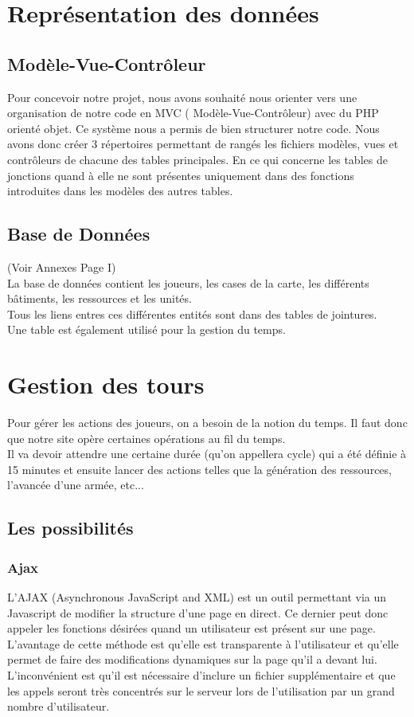 \documentclass[11pt,a4paper]{article}
\begin{document}
\newpage\section{Représentation des données}
\subsection{Modèle-Vue-Contrôleur}
Pour concevoir notre projet, nous avons souhaité nous orienter vers une organisation de notre code en MVC ( Modèle-Vue-Contrôleur) avec du PHP orienté objet. Ce système nous a permis de bien structurer notre code. Nous avons donc créer 3 répertoires permettant de rangés les fichiers modèles, vues et contrôleurs de chacune des tables principales. En ce qui concerne les tables de jonctions quand à elle ne sont présentes uniquement dans des fonctions introduites dans les modèles des autres tables.
\subsection{Base de Données}
(Voir Annexes Page I) \\
La base de données contient les joueurs, les cases de la carte, les différents bâtiments, les ressources et les unités.  \\
Tous les liens entres ces différentes entités sont dans des tables de jointures.\\
Une table est également utilisé pour la gestion du temps.

\newpage\section{Gestion des tours}
Pour gérer les actions des joueurs, on a besoin de la notion du temps. Il faut donc que notre site opère certaines opérations au fil du temps. \\
Il va devoir attendre une certaine durée (qu'on appellera cycle) qui a été définie à 15 minutes et ensuite lancer des actions telles que la génération des ressources, l'avancée d'une armée, etc...\\
\subsection{Les possibilités}
\subsubsection{Ajax}
L'AJAX (Asynchronous JavaScript and XML) est un outil permettant via un Javascript de modifier la structure d'une page en direct. 
Ce dernier peut donc appeler les fonctions désirées quand un utilisateur est présent sur une page.\\
L'avantage de cette méthode est qu'elle est transparente à l'utilisateur et qu'elle permet de faire des modifications dynamiques sur la page qu'il a devant lui. \\
L'inconvénient est qu'il est nécessaire d'inclure un fichier supplémentaire et que les appels seront très concentrés sur le serveur lors de l'utilisation par un grand nombre d'utilisateur.\\
\end{document}
